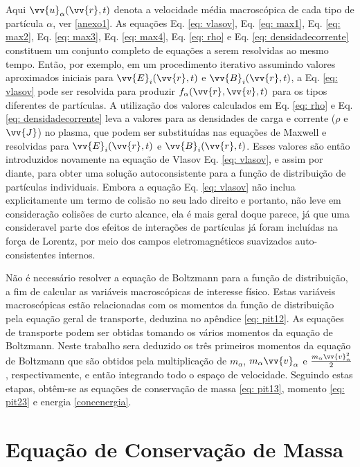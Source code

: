 \documentclass[12pt,oneside,a4paper]{abntex2}
\theoremstyle{definition}  %
\begin{document}
Aqui $ \vv{u}_\alpha(\vv{r},t)$ denota a velocidade média macroscópica de cada tipo de partícula $\alpha$, ver \ref{anexo1}. As equações Eq. \ref{eq: vlasov}, Eq. \ref{eq: max1}, Eq. \ref{eq: max2}, Eq. \ref{eq: max3}, Eq. \ref{eq: max4}, Eq. \ref{eq: rho} e Eq. \ref{eq: densidadecorrente} constituem um conjunto completo de equações a serem resolvidas ao mesmo tempo. Então, por exemplo, em um procedimento iterativo assumindo valores aproximados iniciais para $\vv{E}_i(\vv{r}, t)$ e $\vv{B}_i(\vv{r}, t)$, a Eq. \ref{eq: vlasov} pode ser resolvida para produzir $f_\alpha(\vv{r},\vv{v},t)$ para os tipos diferentes de partículas. A utilização dos valores calculados em Eq. \ref{eq: rho} e Eq. \ref{eq: densidadecorrente} leva a valores para as densidades de carga e corrente ($\rho$ e  $\vv{J}$) no plasma, que podem ser substituídas nas equações de Maxwell e resolvidas para $\vv{E}_i(\vv{r}, t)$ e $\vv{B}_i(\vv{r}, t)$. Esses valores são então introduzidos novamente na equação de Vlasov Eq. \ref{eq: vlasov}, e assim por diante, para obter uma solução autoconsistente para a função de distribuição de partículas individuais. Embora a equação Eq. \ref{eq: vlasov} não inclua explicitamente um termo de colisão no seu lado direito e portanto, não leve em consideração colisões de curto alcance, ela é mais geral doque parece, já que uma consideravel parte dos efeitos de interações de partículas já foram incluídas na força de Lorentz, por meio dos campos eletromagnéticos suavizados auto-consistentes internos. 

Não é necessário resolver a equação de Boltzmann para a função de distribuição, a fim de calcular as variáveis macroscópicas de interesse físico. Estas variáveis macroscópicas estão relacionadas com os momentos da função de distribuição pela equação geral de transporte, deduzina no apêndice \ref{eq: pit12}. As equações de transporte podem ser obtidas tomando os vários momentos da equação de Boltzmann. Neste trabalho sera deduzido os três primeiros momentos da equação de Boltzmann que são obtidos pela multiplicação de $m_\alpha$, $m_\alpha \vv{v}_\alpha$ e $\frac{m_\alpha \vv{v}^2_\alpha}{2}$, respectivamente, e então integrando todo o espaço de velocidade. Seguindo estas etapas, obtêm-se as equações de conservação de massa \ref{eq: pit13}, momento \ref{eq: pit23} e energia \ref{concenergia}.

\section{Equação de Conservação de Massa}
\end{document}
